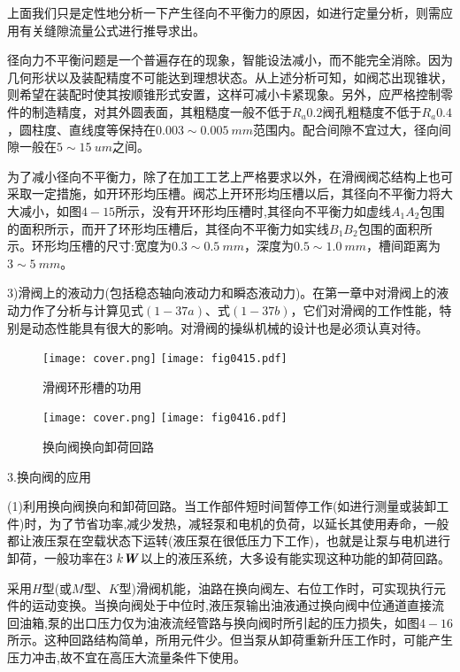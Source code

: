 
上面我们只是定性地分析一下产生径向不平衡力的原因，如进行定量分析，则需应用有关缝隙流量公式进行推导求出。

径向力不平衡问题是一个普遍存在的现象，智能设法减小，而不能完全消除。因为几何形状以及装配精度不可能达到理想状态。从上述分析可知，如阀芯出现锥状，则希望在装配时使其按顺锥形式安置，这样可减小卡紧现象。另外，应严格控制零件的制造精度，对其外圆表面，其粗糙度一般不低于$R_a0.2$阀孔粗糙度不低于$R_a0.4$，圆柱度、直线度等保持在$0.003\sim0.005 \ mm$范围内。配合间隙不宜过大，径向间隙一般在$5\sim15 \ u m$之间。

为了减小径向不平衡力，除了在加工工艺上严格要求以外，在滑阀阀芯结构上也可采取一定措施，如开环形均压槽。阀芯上开环形均压槽以后，其径向不平衡力将大大减小，如图$4-15$所示，没有开环形均压槽时,其径向不平衡力如虚线$A_1A_2$包围的面积所示，而开了环形均压槽后，其径向不平衡力如实线$B_1B_2$包围的面积所示。环形均压槽的尺寸:宽度为$0.3 \sim0.5 \ mm$，深度为$0.5\sim 1. 0\ mm$，槽间距离为$3\sim 5\ mm$。

3)滑阀上的液动力(包括稳态轴向液动力和瞬态液动力)。在第一章中对滑阀上的液动力作了分析与计算见式$(1-37a)$、式$(1-37b)$，它们对滑阀的工作性能，特别是动态性能具有很大的影响。对滑阀的操纵机械的设计也是必须认真对待。
\begin{figure}
    \centering
    \ifOpenSource
    \texttt{[image: cover.png]}
    \else
    \texttt{[image: fig0415.pdf]} 
     \fi
     \caption{滑阀环形槽的功用}
    \label{fig:fig0415}
       
\end{figure}
\begin{figure}
    \centering
    \ifOpenSource
    \texttt{[image: cover.png]}
    \else
    \texttt{[image: fig0416.pdf]} 
     \fi
     \caption{换向阀换向卸荷回路}
    \label{fig:fig0416}
       
\end{figure}


3.换向阀的应用

(1)利用换向阀换向和卸荷回路。当工作部件短时间暂停工作(如进行测量或装卸工件)时，为了节省功率,减少发热，减轻泵和电机的负荷，以延长其使用寿命，一般都让液压泵在空载状态下运转(液压泵在很低压力下工作)，也就是让泵与电机进行卸荷，一般功率在$3\ k\textbf{\emph{W}}$以上的液压系统，大多设有能实现这种功能的卸荷回路。

采用$H$型(或$M$型、$K$型)滑阀机能，油路在换向阀左、右位工作时，可实现执行元件的运动变换。当换向阀处于中位时,液压泵输出油液通过换向阀中位通道直接流回油箱,泵的出口压力仅为油液流经管路与换向阀时所引起的压力损失，如图$4-16$所示。这种回路结构简单，所用元件少。但当泵从卸荷重新升压工作时，可能产生压力冲击,故不宜在高压大流量条件下使用。


